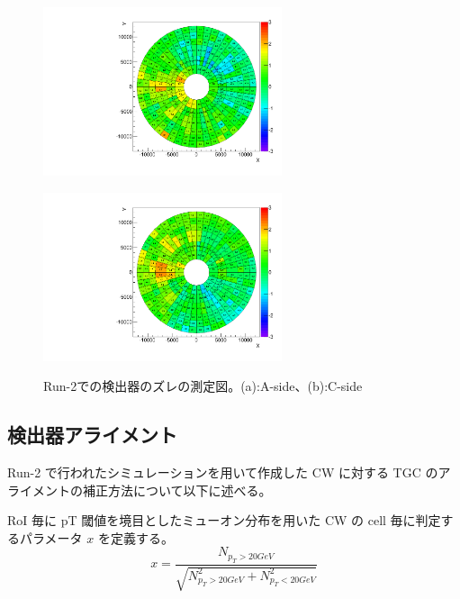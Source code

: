 \begin{figure}
    \begin{minipage}[tb]{0.4\linewidth}
        \centering
        \includegraphics[clip, width=7cm]{fig/3/TGCAlign_CW.muon.bias.20160606.v1.A-side.pdf}
        \vspace{10pt}
        \subcaption{}
        \label{}
    \end{minipage}
    \hfill
    \begin{minipage}[tb]{0.4\linewidth}
        \centering
        \includegraphics[clip, width=7cm]{fig/3/TGCAlign_CW.muon.bias.20160606.v1.C-side.pdf}
        \vspace{10pt}
        \subcaption{}
        \label{}
    \end{minipage}
    \caption{Run-2での検出器のズレの測定図。(a):A-side、(b):C-side}
    \label{fig:ズレ}
\end{figure}

\subsection{検出器アライメント}
Run-2 で行われたシミュレーションを用いて作成した CW に対する TGC のアライメントの補正方法について以下に述べる。

RoI 毎に pT 閾値を境目としたミューオン分布を用いた CW の cell 毎に判定するパラメータ $x$ を定義する。
\begin{equation}
    x = \frac{N_{p_{T}>20GeV}}{\sqrt{N^2_{p_{T}>20GeV}+N^2_{p_{T}<20GeV}}}
　\label{equ:fitting}
\end{equation}



